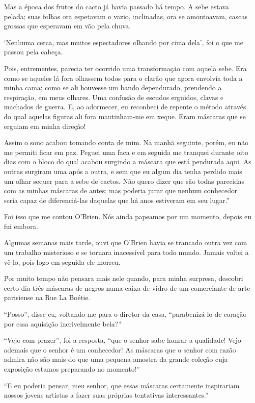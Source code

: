 Mas a época dos frutos do cacto já havia passado há tempo. A sebe estava
pelada; suas folhas ora espetavam o vazio, inclinadas, ora se
amontoavam, cascas grossas que esperavam em vão pela chuva.

`Nenhuma cerca, mas muitos espectadores olhando por cima dela', foi o
que me passou pela cabeça.

Pois, entrementes, parecia ter ocorrido uma transformação com aquela
sebe. Era como se aqueles lá fora olhassem todos para o clarão que agora
envolvia toda a minha cama; como se ali houvesse um bando dependurado,
prendendo a respiração, em meus olhares. Uma confusão de escudos
erguidos, clavas e machados de guerra. E, ao adormecer, eu reconheci de
repente o método através do qual aquelas figuras ali fora mantinham-me
em xeque. Eram máscaras que se erguiam em minha direção!

Assim o sono acabou tomando conta de mim. Na manhã seguinte, porém, eu
não me permiti ficar em paz. Peguei uma faca e em seguida me tranquei
durante oito dias com o bloco do qual acabou surgindo a máscara que está
pendurada aqui. As outras surgiram uma após a outra, e sem que eu algum
dia tenha perdido mais um olhar sequer para a sebe de cactos. Não quero
dizer que são todas parecidas com as minhas máscaras de antes; mas
poderia jurar que nenhum conhecedor seria capaz de diferenciá-las
daquelas que há anos estiveram em seu lugar.''

Foi isso que me contou O'Brien. Nós ainda papeamos por um momento,
depois eu fui embora.

Algumas semanas mais tarde, ouvi que O'Brien havia se trancado outra vez
com um trabalho misterioso e se tornara inacessível para todo mundo.
Jamais voltei a vê-lo, pois logo em seguida ele morreu.

Por muito tempo não pensara mais nele quando, para minha surpresa,
descobri certo dia três máscaras de negros numa caixa de vidro de um
comerciante de arte parisiense na Rue La Boétie.

``Posso'', disse eu, voltando-me para o diretor da casa, ``parabenizá-lo
de coração por essa aquisição incrivelmente bela?''

``Vejo com prazer'', foi a resposta, ``que o senhor sabe honrar a
qualidade! Vejo ademais que o senhor é um conhecedor! As máscaras que o
senhor com razão admira não são mais do que uma pequena amostra da
grande coleção cuja exposição estamos preparando no momento!''

``E eu poderia pensar, meu senhor, que essas máscaras certamente
inspirariam nossos jovens artistas a fazer suas próprias tentativas
interessantes.\label{supra8}''


